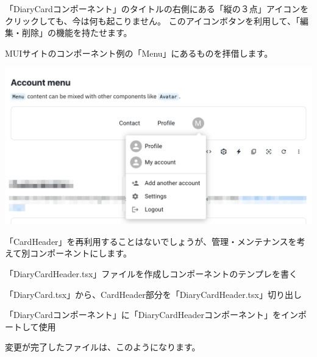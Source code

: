 「DiaryCardコンポーネント」のタイトルの右側にある「縦の３点」アイコンをクリックしても、今は何も起こりません。
このアイコンボタンを利用して、「編集・削除」の機能を持たせます。

MUIサイトのコンポーネント例の「Menu」にあるものを拝借します。

\begin{reviewimage}%
\includegraphics[width=0.6\maxwidth]{./images/03-todo-with-react/mui010-card-Menu.png}%
\label{image:03-todo-with-react:mui010-card-Menu}
\end{reviewimage}
\vspace*{\baselineskip}

「CardHeader」を再利用することはないでしょうが、管理・メンテナンスを考えて別コンポーネントにします。

\vspace*{\baselineskip}

\begin{starterenumerate}
\item 「DiaryCardHeader.tsx」ファイルを作成しコンポーネントのテンプレを書く
\item 「DiaryCard.tsx」から、CardHeader部分を「DiaryCardHeader.tsx」切り出し
\item 「DiaryCardコンポーネント」に「DiaryCardHeaderコンポーネント」をインポートして使用
\end{starterenumerate}

変更が完了したファイルは、このようになります。

